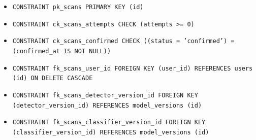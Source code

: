\begin{itemize}
\item \raggedright {\small\texttt{CONSTRAINT pk\_\allowbreak{}\allowbreak{}scans PRIMARY KEY (id)}}
\item \raggedright {\small\texttt{CONSTRAINT ck\_\allowbreak{}\allowbreak{}scans\_\allowbreak{}\allowbreak{}attempts CHECK (attempts >= 0)}}
\item \raggedright {\small\texttt{CONSTRAINT ck\_\allowbreak{}\allowbreak{}scans\_\allowbreak{}\allowbreak{}confirmed CHECK ((status = 'confirmed') = (confirmed\_\allowbreak{}\allowbreak{}at IS NOT NULL))}}
\item \raggedright {\small\texttt{CONSTRAINT fk\_\allowbreak{}\allowbreak{}scans\_\allowbreak{}\allowbreak{}user\_\allowbreak{}\allowbreak{}id FOREIGN KEY (user\_\allowbreak{}\allowbreak{}id) REFERENCES users (id) ON DELETE CASCADE}}
\item \raggedright {\small\texttt{CONSTRAINT fk\_\allowbreak{}\allowbreak{}scans\_\allowbreak{}\allowbreak{}detector\_\allowbreak{}\allowbreak{}version\_\allowbreak{}\allowbreak{}id FOREIGN KEY (detector\_\allowbreak{}\allowbreak{}version\_\allowbreak{}\allowbreak{}id) REFERENCES model\_\allowbreak{}\allowbreak{}versions (id)}}
\item \raggedright {\small\texttt{CONSTRAINT fk\_\allowbreak{}\allowbreak{}scans\_\allowbreak{}\allowbreak{}classifier\_\allowbreak{}\allowbreak{}version\_\allowbreak{}\allowbreak{}id FOREIGN KEY (classifier\_\allowbreak{}\allowbreak{}version\_\allowbreak{}\allowbreak{}id) REFERENCES model\_\allowbreak{}\allowbreak{}versions (id)}}
\end{itemize}
